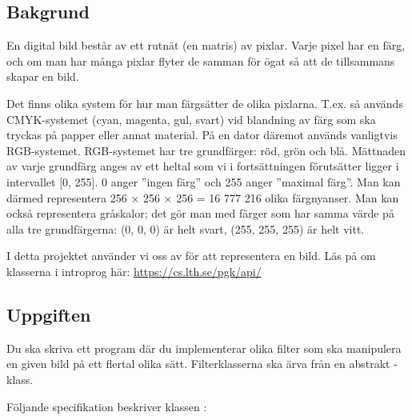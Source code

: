 

\subsection{Bakgrund}

En digital bild består av ett rutnät (en matris) av pixlar. Varje pixel har en färg, och om man har många pixlar flyter de samman för ögat så att de tillsammans skapar en bild.

Det finns olika system för hur man färgsätter de olika pixlarna. T.ex. så används CMYK-systemet (cyan, magenta, gul, svart) vid blandning av färg som ska tryckas på papper eller annat material. På en dator däremot används vanligtvis RGB-systemet. RGB-systemet har tre grundfärger: röd, grön och blå. Mättnaden av varje grundfärg anges av ett heltal som vi i fortsättningen förutsätter ligger i intervallet [0, 255]. 0 anger ''ingen färg'' och 255 anger ''maximal färg''. Man kan därmed representera 256 × 256 × 256 = 16 777 216 olika färgnyanser. Man kan också representera gråskalor; det gör man med färger som har samma värde på alla tre grundfärgerna: (0, 0, 0) är helt svart, (255, 255, 255) är helt vitt.

I detta projektet använder vi oss av  för att representera en bild. Läs på om klasserna i introprog här: 
\url{https://cs.lth.se/pgk/api/}

\subsection{Uppgiften}
Du ska skriva ett program där du implementerar olika filter som ska manipulera en given bild på ett flertal olika sätt. 
Filterklasserna ska ärva från en abstrakt -klass.

Följande specifikation beskriver klassen :

